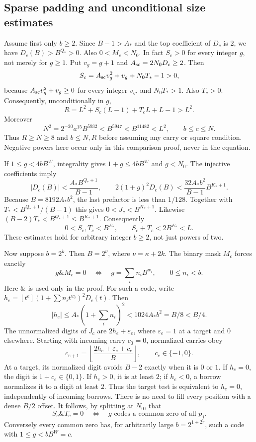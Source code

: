 \subsection{Sparse padding and unconditional size estimates}
Assume first only $b\ge2$. Since $B-1>A_*$ and the top coefficient of $D_c$
is $2$, we have $D_c(B)>B^{Q_*}>0$. Also $0<M_c<N_0$.
In fact $S_c>0$ for every integer $g$, not merely for $g\ge1$.
Put $v_g=g+1$ and $A_{\rm sc}=2N_0D_c\ge2$. Then
\[
 S_c=A_{\rm sc}v_g^2+v_g+N_0T_*-1>0,
\]
because $A_{\rm sc}v_g^2+v_g\ge0$ for every integer $v_g$, and $N_0T_*>1$.
Also $T_c>0$. Consequently, unconditionally in $g$,
\[
 R=L^2+S_c(L-1)+T_cL+L-1>L^2.
\]
Moreover
\[
 N^2=2^{-20}a^{15}B^{5932}<B^{5947}<B^{11482}<L^2,
 \qquad b\le c\le N.
\]
Thus $R\ge N\ge8$ and $b\le N,R$ before assuming any carry or square
condition. Negative powers here occur only in this comparison proof, never
in the equation.

If $1\le g<4bB^W$, integrality gives $1+g\le4bB^W$ and $g<N_0$.
The injective coefficients imply
\[
 |D_c(B)|<\frac{A_*B^{Q_*+1}}{B-1},\qquad
 2(1+g)^2D_c(B)<\frac{32A_*b^2}{B-1}B^{K_*+1}.
\]
Because $B=8192A_*b^2$, the last prefactor is less than $1/128$.
Together with $T_*<B^{Q_*+1}/(B-1)$ this gives
$0<J_c<B^{K_*+1}$. Likewise $(B-2)T_*<B^{Q_*+1}\le B^{K_*+1}$.
Consequently
\[
 0<S_c,T_c<B^{E_*},\qquad S_c+T_c<2B^{E_*}<L.
\]
These estimates hold for arbitrary integer $b\ge2$, not just powers of two.

Now suppose $b=2^k$. Then $B=2^\nu$, where $\nu=\kappa+2k$.
The binary mask $M_c$ forces exactly
\[
 g\mathbin{\&}M_c=0\quad\Longleftrightarrow\quad
 g=\sum_i n_iB^{w_i},\qquad 0\le n_i<b.
\]
Here $\&$ is used only in the proof. For such a code, write
$h_e=[t^e](1+\sum n_it^{w_i})^2D_c(t)$. Then
\[
 |h_e|\le A_*(1+\textstyle\sum_i n_i)^2
 <1024A_*b^2=B/8<B/4.
\]
The unnormalized digits of $J_c$ are $2h_e+\varepsilon_e$, where
$\varepsilon_e=1$ at a target and $0$ elsewhere. Starting with incoming
carry $c_0=0$, normalized carries obey
\[
 c_{e+1}=\left\lfloor\frac{2h_e+\varepsilon_e+c_e}{B}\right\rfloor,
 \qquad c_e\in\{-1,0\}.
\]
At a target, its normalized digit avoids $B-2$ exactly when it is $0$ or $1$.
If $h_e=0$, the digit is $1+c_e\in\{0,1\}$. If $h_e>0$, it is at least $2$;
if $h_e<0$, a borrow normalizes it to a digit at least $2$.
Thus the target test is equivalent to $h_e=0$, independently of incoming
borrows. There is no need to fill every position with a dense $B/2$ offset.
It follows, by splitting at $N_0$, that
\[
 S_c\mathbin{\&}T_c=0\quad\Longleftrightarrow\quad
 g\text{ codes a common zero of all }p_j.
\]
Conversely every common zero has, for arbitrarily large $b=2^{1+2r}$, such a
code with $1\le g<bB^W=c$.

